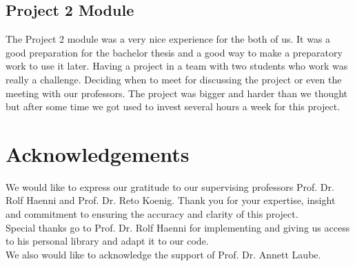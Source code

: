 \documentclass{article}
\begin{document}
\subsection{Project 2 Module}
The Project 2 module was a very nice experience for the both of us. It was a good preparation for the bachelor thesis and a good way to make a preparatory work to use it later. Having a project in a team with two students who work was really a challenge. Deciding when to meet for discussing the project or even the meeting with our professors. The project was bigger and harder than we thought but after some time we got used to invest several hours a week for this project.

\section*{Acknowledgements}
We would like to express our gratitude to our supervising professors Prof. Dr. Rolf Haenni and Prof. Dr. Reto Koenig. Thank you for your expertise, insight and commitment to ensuring the accuracy and clarity of this project. \\
Special thanks go to Prof. Dr. Rolf Haenni for implementing and giving us access to his personal library and adapt it to our code. \\
We also would like to acknowledge the support of Prof. Dr. Annett Laube. \newpage







\printglossaries
\printbibliography
\end{document}

